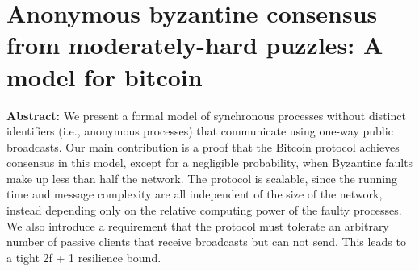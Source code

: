 \section{Anonymous byzantine consensus from moderately-hard puzzles: A model for bitcoin}

\textbf{Abstract:} 
We present a formal model of synchronous processes without distinct identifiers (i.e., anonymous processes) that communicate using one-way public broadcasts. Our main contribution is a proof that the Bitcoin protocol achieves consensus in this model, except for a negligible probability, when Byzantine faults make up less than half the network. The protocol is scalable, since the running time and message complexity are all independent of the size of the network, instead depending only on the relative computing power of the faulty processes. We also introduce a requirement that the protocol must tolerate an arbitrary number of passive clients that receive broadcasts but can not send. This leads to a tight 2f + 1 resilience bound. 
